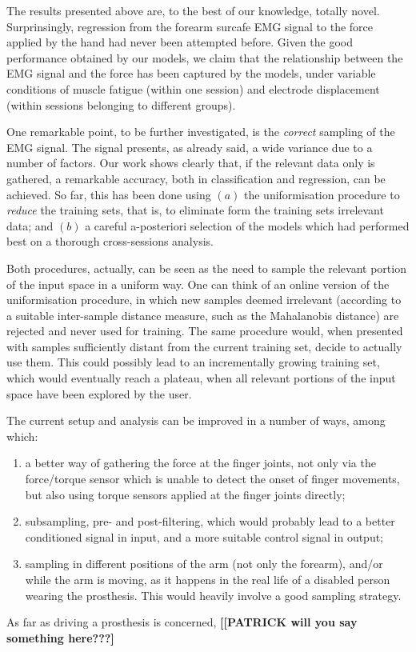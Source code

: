 The results presented above are, to the best of our knowledge, totally
novel. Surprinsingly, regression from the forearm surcafe EMG signal
to the force applied by the hand had never been attempted
before. Given the good performance obtained by our models, we claim
that the relationship between the EMG signal and the force has been
captured by the models, under variable conditions of muscle fatigue
(within one session) and electrode displacement (within sessions
belonging to different groups).

One remarkable point, to be further investigated, is the
\emph{correct} sampling of the EMG signal. The signal presents, as
already said, a wide variance due to a number of factors. Our work
shows clearly that, if the relevant data only is gathered, a
remarkable accuracy, both in classification and regression, can be
achieved. So far, this has been done using $(a)$ the uniformisation
procedure to \emph{reduce} the training sets, that is, to eliminate
form the training sets irrelevant data; and $(b)$ a careful
a-posteriori selection of the models which had performed best on a
thorough cross-sessions analysis.

Both procedures, actually, can be seen as the need to sample the
relevant portion of the input space in a uniform way. One can think of
an online version of the uniformisation procedure, in which new
samples deemed irrelevant (according to a suitable inter-sample
distance measure, such as the Mahalanobis distance) are rejected and
never used for training. The same procedure would, when presented with
samples sufficiently distant from the current training set, decide to
actually use them. This could possibly lead to an incrementally
growing training set, which would eventually reach a plateau, when all
relevant portions of the input space have been explored by the user.

The current setup and analysis can be improved in a number of ways,
among which:

\begin{enumerate}

  \item a better way of gathering the force at the finger joints, not
    only via the force/torque sensor which is unable to detect the
    onset of finger movements, but also using torque sensors applied
    at the finger joints directly;

  \item subsampling, pre- and post-filtering, which would probably
    lead to a better conditioned signal in input, and a more suitable
    control signal in output;

  \item sampling in different positions of the arm (not only the
    forearm), and/or while the arm is moving, as it happens in the
    real life of a disabled person wearing the prosthesis. This would
    heavily involve a good sampling strategy.

\end{enumerate}

As far as driving a prosthesis is concerned, \textbf{[[PATRICK will
you say something here???]}
